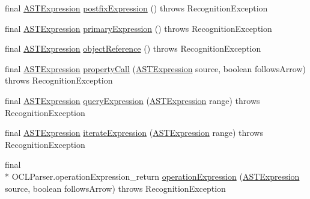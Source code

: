 \begin{DoxyCompactItemize}
\item 
final \hyperlink{classorg_1_1tzi_1_1use_1_1parser_1_1ocl_1_1_a_s_t_expression}{A\-S\-T\-Expression} \hyperlink{classorg_1_1tzi_1_1use_1_1parser_1_1ocl_1_1_o_c_l_parser_a6eb7d2a0d3d1c0b8a383d2038ee49774}{postfix\-Expression} ()  throws Recognition\-Exception 
\item 
final \hyperlink{classorg_1_1tzi_1_1use_1_1parser_1_1ocl_1_1_a_s_t_expression}{A\-S\-T\-Expression} \hyperlink{classorg_1_1tzi_1_1use_1_1parser_1_1ocl_1_1_o_c_l_parser_a1d1b016724e1c7ca458a4d1722a31f65}{primary\-Expression} ()  throws Recognition\-Exception 
\item 
final \hyperlink{classorg_1_1tzi_1_1use_1_1parser_1_1ocl_1_1_a_s_t_expression}{A\-S\-T\-Expression} \hyperlink{classorg_1_1tzi_1_1use_1_1parser_1_1ocl_1_1_o_c_l_parser_a6b637ac419d276d78d48333963215c56}{object\-Reference} ()  throws Recognition\-Exception 
\item 
final \hyperlink{classorg_1_1tzi_1_1use_1_1parser_1_1ocl_1_1_a_s_t_expression}{A\-S\-T\-Expression} \hyperlink{classorg_1_1tzi_1_1use_1_1parser_1_1ocl_1_1_o_c_l_parser_a4ee54247bcdcdf03b583d71a2dd02141}{property\-Call} (\hyperlink{classorg_1_1tzi_1_1use_1_1parser_1_1ocl_1_1_a_s_t_expression}{A\-S\-T\-Expression} source, boolean follows\-Arrow)  throws Recognition\-Exception 
\item 
final \hyperlink{classorg_1_1tzi_1_1use_1_1parser_1_1ocl_1_1_a_s_t_expression}{A\-S\-T\-Expression} \hyperlink{classorg_1_1tzi_1_1use_1_1parser_1_1ocl_1_1_o_c_l_parser_a19943768f5c8924c9d0bf01c688339dc}{query\-Expression} (\hyperlink{classorg_1_1tzi_1_1use_1_1parser_1_1ocl_1_1_a_s_t_expression}{A\-S\-T\-Expression} range)  throws Recognition\-Exception 
\item 
final \hyperlink{classorg_1_1tzi_1_1use_1_1parser_1_1ocl_1_1_a_s_t_expression}{A\-S\-T\-Expression} \hyperlink{classorg_1_1tzi_1_1use_1_1parser_1_1ocl_1_1_o_c_l_parser_a8e5e6be68e1883ab15d0361ad82fae1d}{iterate\-Expression} (\hyperlink{classorg_1_1tzi_1_1use_1_1parser_1_1ocl_1_1_a_s_t_expression}{A\-S\-T\-Expression} range)  throws Recognition\-Exception 
\item 
final \\*
O\-C\-L\-Parser.\-operation\-Expression\-\_\-return \hyperlink{classorg_1_1tzi_1_1use_1_1parser_1_1ocl_1_1_o_c_l_parser_a42534152891badb08da80d2932ea8a13}{operation\-Expression} (\hyperlink{classorg_1_1tzi_1_1use_1_1parser_1_1ocl_1_1_a_s_t_expression}{A\-S\-T\-Expression} source, boolean follows\-Arrow)  throws Recognition\-Exception 
\item 

\end{DoxyCompactItemize}
